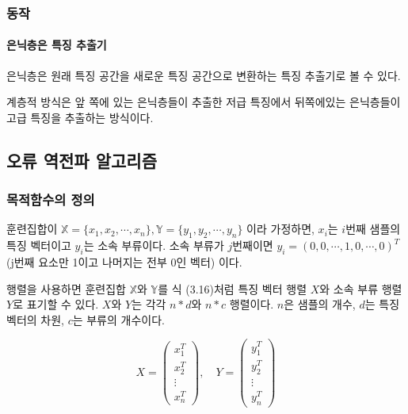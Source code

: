 \documentclass [12pt] {oblivoir}
\let\oldsubsubsection=\subsubsection
\renewcommand{\subsubsection}
{
  \filbreak
  \oldsubsubsection
}
\begin{document}
\vspace{3mm}

\subsubsection{동작}

\paragraph*{은닉층은 특징 추출기}\mbox{}

은닉층은 원래 특징 공간을 새로운 특징 공간으로 변환하는 특징 추출기로 볼 수 있다.

계층적 방식은 앞 쪽에 있는 은닉층들이 추출한 저급 특징에서 뒤쪽에있는 은닉층들이 고급 특징을 추출하는 방식이다.

\vspace{3mm}

\subsection{오류 역전파 알고리즘}

\subsubsection{목적함수의 정의}

\;훈련집합이 $\mathds{X} = \{x_{1}, x_{2}, \cdots, x_{n}\}, \mathds{Y} = \{y_{1}, y_{2}, \cdots, y_{n}\}$ 이라 가정하면,
$x_{i}$는 $i$번째 샘플의 특징 벡터이고 $y_{i}$는 소속 부류이다.
소속 부류가 $j$번째이면 $y_{i} = (0, 0, \cdots, 1, 0, \cdots, 0)^{T}$ (j번째 요소만 1이고 나머지는 전부 0인 벡터) 이다.

행렬을 사용하면 훈련집합 $\mathds{X}$와 $\mathds{Y}$를 식 (3.16)처럼 특징 벡터 행렬 $X$와 소속 부류 행렬 $Y$로 표기할 수 있다.
$X$와 $Y$는 각각 $n*d$와 $n*c$ 행렬이다. $n$은 샘플의 개수,  $d$는 특징 벡터의 차원, $c$는 부류의 개수이다.

\begin{equation} \tag{3.16}
  X =
  \begin{pmatrix}
    x^{T}_{1} \\
    x^{T}_{2} \\
    \vdots \\
    x^{T}_{n}
  \end{pmatrix},
  \quad
  Y =
  \begin{pmatrix}
    y^{T}_{1} \\
    y^{T}_{2} \\
    \vdots \\
    y^{T}_{n}
  \end{pmatrix}
\end{equation}
\end{document}

